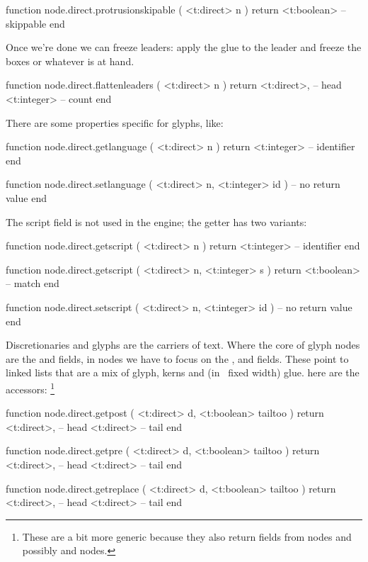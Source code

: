 \starttyping[option=LUA]
function node.direct.protrusionskipable ( <t:direct> n )
    return <t:boolean> -- skippable
end
\stoptyping

Once we're done we can freeze leaders: apply the glue to the leader and freeze
the boxes or whatever is at hand.

\starttyping[option=LUA]
function node.direct.flattenleaders ( <t:direct> n )
    return
        <t:direct>, -- head
        <t:integer> -- count
end
\stoptyping

There are some properties specific for glyphs, like:

\starttyping[option=LUA]
function node.direct.getlanguage ( <t:direct> n )
    return <t:integer> -- identifier
end

function node.direct.setlanguage (
    <t:direct>  n,
    <t:integer> id
)
    -- no return value
end
\stoptyping

The script field is not used in the engine; the getter has two variants:

\starttyping[option=LUA]
function node.direct.getscript ( <t:direct> n )
    return <t:integer> -- identifier
end

function node.direct.getscript ( <t:direct> n, <t:integer> s )
    return <t:boolean> -- match
end

function node.direct.setscript (
    <t:direct>  n,
    <t:integer> id
)
    -- no return value
end
\stoptyping

\stopsubsection

\startsubsection[title=Discretionaries]

Discretionaries and glyphs are the carriers of text. Where the core of \type
{glyph} nodes are the  and  fields, in  nodes
we have to focus on the ,  and  fields.
These point to linked lists that are a mix of glyph, kerns and (in \LUAMETATEX\
fixed width) glue. here are the accessors: \footnote {These are a bit more
generic because they also return fields from \type {choice} nodes and possibly
\type {hlist} and \type {vlist} nodes.}

\starttyping[option=LUA]
function node.direct.getpost ( <t:direct> d, <t:boolean> tailtoo )
    return
        <t:direct>, -- head
        <t:direct>  -- tail
end

function node.direct.getpre ( <t:direct> d, <t:boolean> tailtoo )
    return
        <t:direct>, -- head
        <t:direct>  -- tail
end

function node.direct.getreplace ( <t:direct> d, <t:boolean> tailtoo )
    return
        <t:direct>, -- head
        <t:direct>  -- tail
end
\stoptyping

